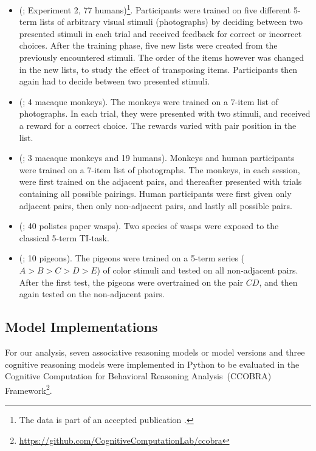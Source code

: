 \documentclass[10pt,letterpaper]{article}
\newcommand{\todo}[1]{{\color{todocolor} \bfseries #1}}
\newcommand{\CCOBRA}{Cognitive Computation for Behavioral Reasoning Analysis}
\begin{document}
	\begin{itemize}
		\setlength\itemsep{-.3em}
		\item \citeauthor{kao2018peerj} (; Experiment 2, 77 humans)\footnote{The data is part of an accepted publication \cite{kao2019apacite}.}. Participants were trained on five different 5-term lists of arbitrary visual stimuli (photographs) by deciding between two presented stimuli in each trial and received feedback for correct or incorrect choices. After the training phase, five new lists were created from the previously encountered stimuli. The order of the items however was changed in the new lists, to study the effect of transposing items. Participants then again had to decide between two presented stimuli.
		\item \citeauthor{jensen2019a} (; 4 macaque monkeys). The monkeys were trained on a 7-item list of photographs. In each trial, they were presented with two stimuli, and received a reward for a correct choice. The rewards varied with pair position in the list.
		\item \citeauthor{jensen2015} (; 3 macaque monkeys and 19 humans). Monkeys and human participants were trained on a 7-item list of photographs. The monkeys, in each session, were first trained on the adjacent pairs, and thereafter presented with trials containing all possible pairings.
		Human participants were first given only adjacent pairs, then only non-adjacent pairs, and lastly all possible pairs.
		\item \citeauthor{tibbetts2019} (; 40 polistes paper wasps). Two species of wasps were exposed to the classical 5-term TI-task.
		\item \citeauthor{camarena2018} (; 10 pigeons). The pigeons were trained on a 5-term series ($A>B>C>D>E$) of color stimuli and tested on all non-adjacent pairs. After the first test, the pigeons were overtrained on the pair $CD$, and then again tested on the non-adjacent pairs.
	\end{itemize}
	
	
	
	\subsection{Model Implementations}
	
	For our analysis, seven associative reasoning models or model versions and three cognitive reasoning models were implemented in Python to be evaluated in the \CCOBRA\ (CCOBRA) Framework\footnote{\url{https://github.com/CognitiveComputationLab/ccobra}}. 
\end{document}
